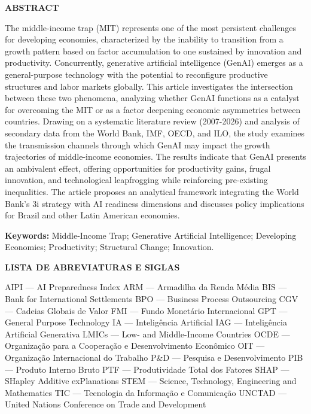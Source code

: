 \documentclass[
  brazilian,
  12pt,
]{article}
\begin{document}
\newpage

\textbf{ABSTRACT}

The middle-income trap (MIT) represents one of the most persistent challenges for developing economies, characterized by the inability to transition from a growth pattern based on factor accumulation to one sustained by innovation and productivity. Concurrently, generative artificial intelligence (GenAI) emerges as a general-purpose technology with the potential to reconfigure productive structures and labor markets globally. This article investigates the intersection between these two phenomena, analyzing whether GenAI functions as a catalyst for overcoming the MIT or as a factor deepening economic asymmetries between countries. Drawing on a systematic literature review (2007-2026) and analysis of secondary data from the World Bank, IMF, OECD, and ILO, the study examines the transmission channels through which GenAI may impact the growth trajectories of middle-income economies. The results indicate that GenAI presents an ambivalent effect, offering opportunities for productivity gains, frugal innovation, and technological leapfrogging while reinforcing pre-existing inequalities. The article proposes an analytical framework integrating the World Bank's 3i strategy with AI readiness dimensions and discusses policy implications for Brazil and other Latin American economies.

\textbf{Keywords:} Middle-Income Trap; Generative Artificial Intelligence; Developing Economies; Productivity; Structural Change; Innovation.

\newpage

\textbf{LISTA DE ABREVIATURAS E SIGLAS}

AIPI --- AI Preparedness Index
ARM --- Armadilha da Renda Média
BIS --- Bank for International Settlements
BPO --- Business Process Outsourcing
CGV --- Cadeias Globais de Valor
FMI --- Fundo Monetário Internacional
GPT --- General Purpose Technology
IA --- Inteligência Artificial
IAG --- Inteligência Artificial Generativa
LMICs --- Low- and Middle-Income Countries
OCDE --- Organização para a Cooperação e Desenvolvimento Econômico
OIT --- Organização Internacional do Trabalho
P\&D --- Pesquisa e Desenvolvimento
PIB --- Produto Interno Bruto
PTF --- Produtividade Total dos Fatores
SHAP --- SHapley Additive exPlanations
STEM --- Science, Technology, Engineering and Mathematics
TIC --- Tecnologia da Informação e Comunicação
UNCTAD --- United Nations Conference on Trade and Development

\newpage
\end{document}
